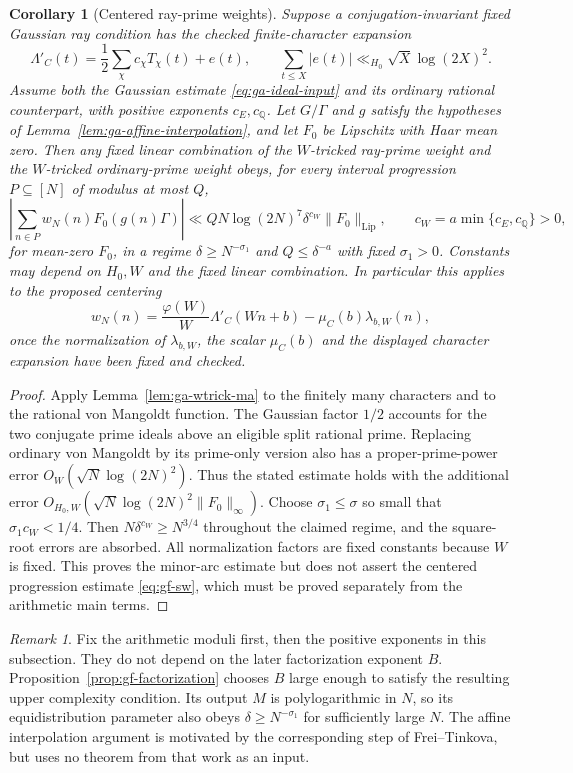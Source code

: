 \documentclass[11pt]{article}
\newtheorem{corollary}[theorem]{Corollary}
\theoremstyle{definition}
\theoremstyle{remark}
\newtheorem{remark}[theorem]{Remark}
\begin{document}
\begin{corollary}[Centered ray-prime weights]\label{cor:ga-centered-primes}
Suppose a conjugation-invariant fixed Gaussian ray condition has the
checked finite-character expansion
\[
 \Lambda'_C(t)=\frac12\sum_\chi c_\chi T_\chi(t)+e(t),
 \qquad \sum_{t\leq X}|e(t)|\ll_{H_0}\sqrt X\log(2X)^2.
\]
Assume both the Gaussian estimate \eqref{eq:ga-ideal-input} and its
ordinary rational counterpart, with positive exponents $c_E,c_{\mathbb Q}$.
Let $G/\Gamma$ and $g$ satisfy the hypotheses of
Lemma~\ref{lem:ga-affine-interpolation}, and let $F_0$ be Lipschitz with
Haar mean zero.
Then any fixed linear combination of the $W$-tricked ray-prime weight
and the $W$-tricked ordinary-prime weight obeys, for every interval
progression $P\subseteq[N]$ of modulus at most $Q$,
\[
 \left|\sum_{n\in P}w_N(n)F_0(g(n)\Gamma)\right|
 \ll QN\log(2N)^7\delta^{c_W}\|F_0\|_{\mathrm{Lip}},
 \qquad c_W=a\min\{c_E,c_{\mathbb Q}\}>0,
\]
for mean-zero $F_0$, in a regime
$\delta\geq N^{-\sigma_1}$ and $Q\leq\delta^{-a}$ with fixed
$\sigma_1>0$. Constants may depend on $H_0,W$ and the fixed linear
combination. In particular this applies to the proposed centering
\[
 w_N(n)=\frac{\varphi(W)}W\Lambda'_C(Wn+b)
             -\mu_C(b)\lambda_{b,W}(n),
\]
once the normalization of $\lambda_{b,W}$, the scalar $\mu_C(b)$ and
the displayed character expansion have been fixed and checked.
\end{corollary}
\begin{proof}
Apply Lemma~\ref{lem:ga-wtrick-ma} to the finitely many characters and
to the rational von Mangoldt function. The Gaussian factor $1/2$
accounts for the two conjugate prime ideals above an eligible split
rational prime. Replacing ordinary von Mangoldt by its prime-only
version also has a proper-prime-power error
$O_W(\sqrt N\log(2N)^2)$. Thus the stated estimate holds with the
additional error
$O_{H_0,W}(\sqrt N\log(2N)^2\|F_0\|_\infty)$.
Choose $\sigma_1\leq\sigma$ so small that $\sigma_1c_W<1/4$.
Then $N\delta^{c_W}\geq N^{3/4}$ throughout the claimed regime, and
the square-root errors are absorbed. All normalization factors are
fixed constants because $W$ is fixed. This proves the minor-arc
estimate but does not assert the centered progression estimate
\eqref{eq:gf-sw}, which must be proved separately from the arithmetic
main terms.
\end{proof}

\begin{remark}\label{rem:ga-choice-order}
Fix the arithmetic moduli first, then the positive exponents in this
subsection. They do not depend on the later factorization exponent
$B$. Proposition~\ref{prop:gf-factorization} chooses $B$ large enough
to satisfy the resulting upper complexity condition. Its output
$M$ is polylogarithmic in $N$, so its equidistribution parameter also
obeys $\delta\geq N^{-\sigma_1}$ for sufficiently large $N$.
The affine interpolation argument is motivated by the corresponding
step of Frei--Tinkova, but uses no theorem from that work as an input.
\end{remark}
\end{document}
